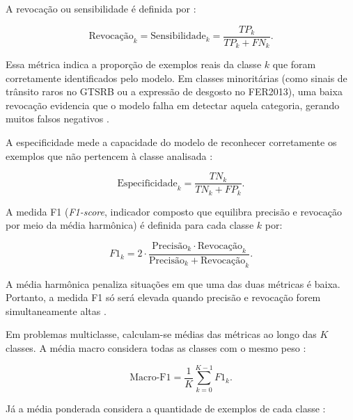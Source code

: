 \documentclass[
    12pt,
    openright,
    oneside,
    a4paper,
    english,
    brazil
]{abntex2}
\begin{document}
A revocação ou sensibilidade é definida por \cite{fawcett2006roc,johnson2019survey,sokolova2009systematic}:

\begin{equation}
\label{eq:revocacao}
\text{Revocação}_k = \text{Sensibilidade}_k =
\frac{TP_k}{TP_k + FN_k}.
\end{equation}

Essa métrica indica a proporção de exemplos reais da classe \(k\) que foram corretamente identificados pelo modelo. Em classes minoritárias (como sinais de trânsito raros no GTSRB ou a expressão de desgosto no FER2013), uma baixa revocação evidencia que o modelo falha em detectar aquela categoria, gerando muitos falsos negativos \cite{johnson2019survey,fawcett2006roc}.

A especificidade mede a capacidade do modelo de reconhecer corretamente os exemplos que não pertencem à classe analisada \cite{fawcett2006roc,johnson2019survey,sokolova2009systematic}:

\begin{equation}
\label{eq:especificidade}
\text{Especificidade}_k =
\frac{TN_k}{TN_k + FP_k}.
\end{equation}

A medida F1 (\textit{F1-score}, indicador composto que equilibra precisão e revocação por meio da média harmônica) \cite{sokolova2009systematic,johnson2019survey} é definida para cada classe \(k\) por:

\begin{equation}
\label{eq:f1_classe}
F1_k =
2 \cdot
\frac{\text{Precisão}_k \cdot \text{Revocação}_k}
{\text{Precisão}_k + \text{Revocação}_k}.
\end{equation}

A média harmônica penaliza situações em que uma das duas métricas é baixa. Portanto, a medida F1 só será elevada quando precisão e revocação forem simultaneamente altas \cite{johnson2019survey,sokolova2009systematic}.

Em problemas multiclasse, calculam-se médias das métricas ao longo das \(K\) classes. A média macro considera todas as classes com o mesmo peso \cite{sokolova2009systematic}:

\begin{equation}
\label{eq:macro_f1}
\text{Macro-F1} =
\frac{1}{K}
\sum_{k=0}^{K-1}
F1_k.
\end{equation}

Já a média ponderada considera a quantidade de exemplos de cada classe \cite{pedregosa2011scikitlearn,sokolova2009systematic}:
\end{document}
